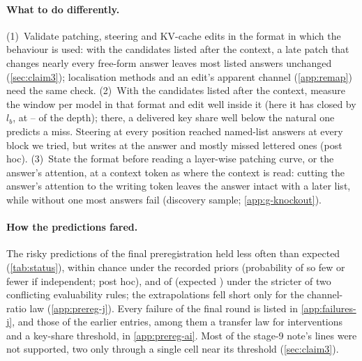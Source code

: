 \paragraph{What to do differently.}
(1)~Validate patching, steering and KV-cache edits in the format in which the behaviour is used: with the candidates listed after the context, a late patch that changes nearly every free-form answer leaves most listed answers unchanged (\cref{sec:claim3}); localisation methods \citep{mueller2025mib} and an edit's apparent channel (\cref{app:remap}) need the same check.
(2)~With the candidates listed after the context, measure the window per model in that format and edit well inside it (here it has closed by $l_b$, at \NqLbFracMin--\NqLbFracMax{} of the depth); there, a delivered key share well below the natural one predicts a miss. Steering at every position reached named-list answers at every block we tried, but writes at the answer and mostly missed lettered ones (post hoc).
(3)~State the format before reading a layer-wise patching curve, or the answer's attention, at a context token as where the context is read: cutting the answer's attention to the writing token leaves the answer intact with a later list, while without one most answers fail (discovery sample; \cref{app:g-knockout}).

\paragraph{How the predictions fared.}
The risky predictions of the final preregistration held less often than expected (\cref{tab:status}), within chance under the recorded priors (probability \JxRiskyTailP{} of so few or fewer if independent; post hoc), and \JxRiskyMetABCDAlt{} of \JxRiskyVerdABCDAlt{} (expected \JxRiskyExpABCDAlt{}) under the stricter of two conflicting evaluability rules; the extrapolations fell short only for the channel-ratio law (\cref{app:prereg-j}). Every failure of the final round is listed in \cref{app:failures-j}, and those of the earlier entries, among them a transfer law for interventions and a key-share threshold, in \cref{app:prereg-ai}. Most of the stage-9 note's lines were not supported, two only through a single cell near its threshold (\cref{sec:claim3}).


